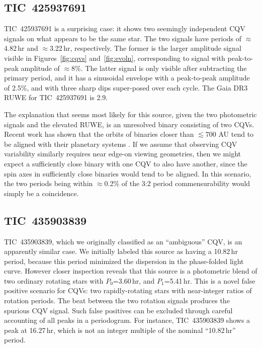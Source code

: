 \documentclass[11pt,twocolumn,tighten]{aastex63}
\begin{document}
\subsection{TIC~425937691}

TIC~425937691 is a surprising case: it shows two seemingly independent
CQV signals on what appears to be the same star.  The two signals have
periods of $\approx$4.82\,hr and $\approx$3.22\,hr, respectively.
The former is the larger amplitude signal visible in
Figures~\ref{fig:cqvs} and~\ref{fig:evoln}, corresponding to signal
with peak-to-peak amplitude of $\approx$8\%.  The latter signal is
only visible after subtracting the primary period, and it has a
sinusoidal envelope with a peak-to-peak amplitude of 2.5\%, and with
three sharp dips super-posed over each cycle.  The Gaia DR3 RUWE for
TIC~425937691 is 2.9.

The explanation that seems most likely for this source, given the two
photometric signals and the elevated RUWE, is an unresolved binary
consisting of two CQVs.  Recent work has shown that the orbits of
binaries closer than $\lesssim$700 AU tend to be aligned with their
planetary systems \citep{2022AJ....163..207C}.  If we assume that
observing CQV variability similarly requires near edge-on viewing
geometries, then we might expect a sufficiently close binary with one
CQV to also have another, since the spin axes in sufficiently close
binaries would tend to be aligned.  In this scenario, the two periods
being within $\approx$0.2\% of the 3:2 period commensurability would
simply be a coincidence.


\subsection{TIC~435903839}


TIC~435903839, which we originally classified as an ``ambiguous'' CQV,
is an apparently similar case.  We initially labeled this source as
having a 10.82\,hr period, because this period minimized the
dispersion in the phase-folded light curve.  However closer inspection
reveals that this source is a photometric blend of two ordinary
rotating stars with $P_0$=3.60\,hr, and $P_1$=5.41\,hr.  This is a
novel false positive scenario for CQVs: two rapidly-rotating stars
with near-integer ratios of rotation periods.  The beat between the
two rotation signals produces the spurious CQV signal.  Such false
positives can be excluded through careful accounting of all peaks in a
periodogram.  For instance, TIC~435903839 shows a peak at 16.27\,hr,
which is not an integer multiple of the nominal ``10.82\,hr'' period.
\end{document}
